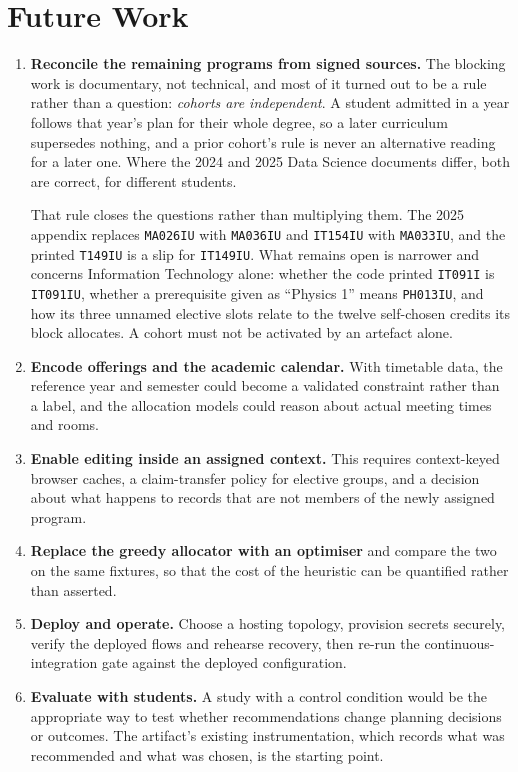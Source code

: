 \section{Future Work}

\begin{enumerate}
  \item \textbf{Reconcile the remaining programs from signed sources.} The blocking work is
        documentary, not technical, and most of it turned out to be a rule rather than a question:
        \emph{cohorts are independent}. A student admitted in a year follows that year's plan for
        their whole degree, so a later curriculum supersedes nothing, and a prior cohort's rule is
        never an alternative reading for a later one. Where the 2024 and 2025 Data Science documents
        differ, both are correct, for different students.

        That rule closes the questions rather than multiplying them. The 2025 appendix replaces
        \texttt{MA026IU} with \texttt{MA036IU} and \texttt{IT154IU} with \texttt{MA033IU}, and the
        printed \texttt{T149IU} is a slip for \texttt{IT149IU}. What remains open is narrower and
        concerns Information Technology alone: whether the code printed \texttt{IT091I} is
        \texttt{IT091IU}, whether a prerequisite given as ``Physics 1'' means \texttt{PH013IU}, and
        how its three unnamed elective slots relate to the twelve self-chosen credits its block
        allocates. A cohort must not be activated by an artefact alone.
  \item \textbf{Encode offerings and the academic calendar.} With timetable data, the reference
        year and semester could become a validated constraint rather than a label, and the
        allocation models could reason about actual meeting times and rooms.
  \item \textbf{Enable editing inside an assigned context.} This requires context-keyed browser
        caches, a claim-transfer policy for elective groups, and a decision about what happens to
        records that are not members of the newly assigned program.
  \item \textbf{Replace the greedy allocator with an optimiser} and compare the two on the same
        fixtures, so that the cost of the heuristic can be quantified rather than asserted.
  \item \textbf{Deploy and operate.} Choose a hosting topology, provision secrets securely, verify
        the deployed flows and rehearse recovery, then re-run the continuous-integration gate
        against the deployed configuration.
  \item \textbf{Evaluate with students.} A study with a control condition would be the appropriate
        way to test whether recommendations change planning decisions or outcomes. The artifact's
        existing instrumentation, which records what was recommended and what was chosen, is the
        starting point.
\end{enumerate}

